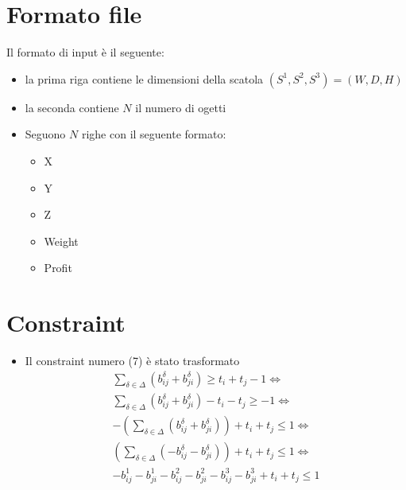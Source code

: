 \documentclass{scrartcl}
\begin{document}
\section{Formato file}
Il formato di input è il seguente:
\begin{itemize}
	\item la prima riga contiene le dimensioni della scatola $(S^1, S^2, S^3) = (W, D, H)$
	\item la seconda contiene $N$ il numero di ogetti
	\item Seguono $N$ righe con il seguente formato:
	\begin{itemize}
		\item X 
		\item Y
		\item Z
		\item Weight
		\item Profit
	\end{itemize}
\end{itemize}

\section{Constraint}
\begin{itemize}
	\item 
	Il constraint numero (7) è stato trasformato
	$$
	\begin{array}{l}
	\sum_{\delta \in \Delta}(b_{ij}^\delta + b_{ji}^\delta) \geq t_i + t_j - 1 \iff \\
	\sum_{\delta \in \Delta}(b_{ij}^\delta + b_{ji}^\delta) - t_i - t_j \geq - 1 \iff \\
	-(\sum_{\delta \in \Delta}(b_{ij}^\delta + b_{ji}^\delta)) + t_i + t_j \leq  1 \iff \\
	(\sum_{\delta \in \Delta}(-b_{ij}^\delta - b_{ji}^\delta)) + t_i + t_j \leq  1 \iff \\
	- b_{ij}^1 - b_{ji}^1 - b_{ij}^2 - b_{ji}^2 - b_{ij}^3 - b_{ji}^3 + t_i + t_j \leq  1
	\end{array}
	$$
\end{itemize}
\end{document}
